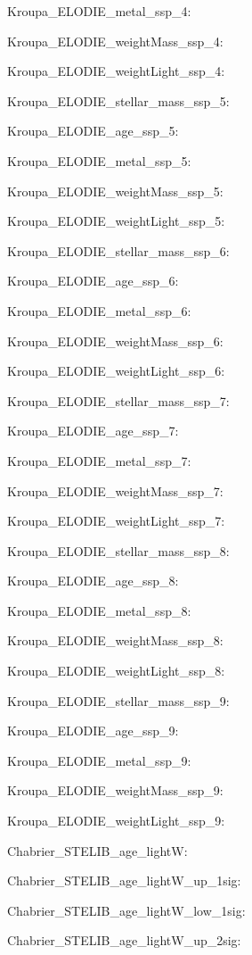 \item Kroupa\_ELODIE\_metal\_ssp\_4: 
\item Kroupa\_ELODIE\_weightMass\_ssp\_4: 
\item Kroupa\_ELODIE\_weightLight\_ssp\_4: 
\item Kroupa\_ELODIE\_stellar\_mass\_ssp\_5: 
\item Kroupa\_ELODIE\_age\_ssp\_5: 
\item Kroupa\_ELODIE\_metal\_ssp\_5: 
\item Kroupa\_ELODIE\_weightMass\_ssp\_5: 
\item Kroupa\_ELODIE\_weightLight\_ssp\_5: 
\item Kroupa\_ELODIE\_stellar\_mass\_ssp\_6: 
\item Kroupa\_ELODIE\_age\_ssp\_6: 
\item Kroupa\_ELODIE\_metal\_ssp\_6: 
\item Kroupa\_ELODIE\_weightMass\_ssp\_6: 
\item Kroupa\_ELODIE\_weightLight\_ssp\_6: 
\item Kroupa\_ELODIE\_stellar\_mass\_ssp\_7: 
\item Kroupa\_ELODIE\_age\_ssp\_7: 
\item Kroupa\_ELODIE\_metal\_ssp\_7: 
\item Kroupa\_ELODIE\_weightMass\_ssp\_7: 
\item Kroupa\_ELODIE\_weightLight\_ssp\_7: 
\item Kroupa\_ELODIE\_stellar\_mass\_ssp\_8: 
\item Kroupa\_ELODIE\_age\_ssp\_8: 
\item Kroupa\_ELODIE\_metal\_ssp\_8: 
\item Kroupa\_ELODIE\_weightMass\_ssp\_8: 
\item Kroupa\_ELODIE\_weightLight\_ssp\_8: 
\item Kroupa\_ELODIE\_stellar\_mass\_ssp\_9: 
\item Kroupa\_ELODIE\_age\_ssp\_9: 
\item Kroupa\_ELODIE\_metal\_ssp\_9: 
\item Kroupa\_ELODIE\_weightMass\_ssp\_9: 
\item Kroupa\_ELODIE\_weightLight\_ssp\_9: 
\item Chabrier\_STELIB\_age\_lightW: 
\item Chabrier\_STELIB\_age\_lightW\_up\_1sig: 
\item Chabrier\_STELIB\_age\_lightW\_low\_1sig: 
\item Chabrier\_STELIB\_age\_lightW\_up\_2sig: 
